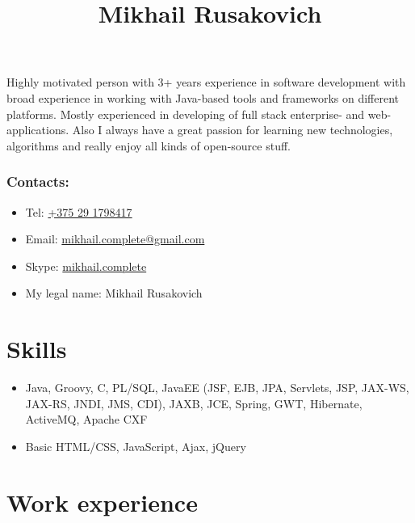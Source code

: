 \documentclass[a4paper, 12pt]{article}
\title{Mikhail Rusakovich}
\author{}
\date{}
\begin{document}
\maketitle

Highly motivated person with 3+ years experience in software development with broad experience in working with Java-based tools and frameworks on different platforms.
Mostly experienced in developing of full stack enterprise- and web- applications.
Also I always have a great passion for learning new technologies, algorithms and really enjoy all kinds of open-source stuff.

\subsubsection*{Contacts:}
\begin{itemize}
    \item Tel: \href{tel:+375291798417}{+375 29 1798417}
    \item Email: \href{mailto:mikhail.complete@gmail.com}{mikhail.complete@gmail.com}
    \item Skype: \href{callto:mikhail.complete}{mikhail.complete}
    \item My legal name: Mikhail Rusakovich
\end{itemize}


\section*{Skills}

    \begin{itemize}
        \item Java, Groovy, C, PL/SQL, JavaEE (JSF, EJB, JPA, Servlets, JSP, JAX-WS, JAX-RS, JNDI, JMS, CDI), JAXB, JCE, Spring, GWT, Hibernate, ActiveMQ, Apache CXF  
        \item Basic HTML/CSS, JavaScript, Ajax, jQuery
    \end{itemize}


\section*{Work experience}
\end{document}
